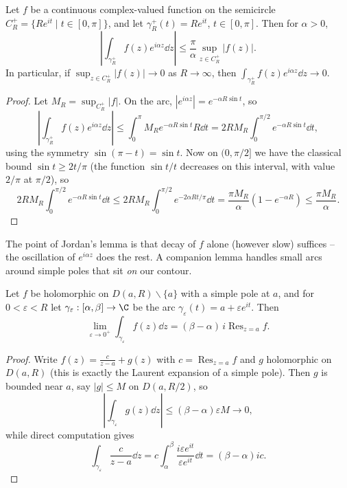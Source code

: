 \begin{lemma}
    Let $f$ be a continuous complex-valued function on the semicircle $C_R^+ = \{Re^{it} \mid t \in [0, \pi]\}$, and let $\gamma_R^+(t) = Re^{it}$, $t \in [0, \pi]$. Then for $\alpha > 0$,
    $$
    \left|\int_{\gamma_R^+} f(z)e^{i \alpha z} \dd z\right| \leq \frac{\pi}{\alpha} \sup_{z \in C_R^+} |f(z)|.
    $$
    In particular, if $\sup_{z \in C^+_R}|f(z)| \rightarrow 0$ as $R \rightarrow \infty$, then $\int_{\gamma_R^+} f(z)e^{i \alpha z} \dd z \rightarrow 0$.
\end{lemma}
\begin{proof}
    Let $M_R = \sup_{C_R^+}|f|$. On the arc, $|e^{i \alpha z}| = e^{-\alpha R \sin t}$, so
    $$
    \left|\int_{\gamma_R^+} f(z)e^{i \alpha z} \dd z\right| \leq \int_0^\pi M_R e^{-\alpha R \sin t} R \dd t = 2 R M_R \int_0^{\pi/2} e^{-\alpha R \sin t} \dd t,
    $$
    using the symmetry $\sin(\pi - t) = \sin t$. Now on $(0, \pi/2]$ we have the classical bound $\sin t \geq 2t/\pi$ (the function $\sin t / t$ decreases on this interval, with value $2/\pi$ at $\pi/2$), so
    \[
    2RM_R \int_0^{\pi/2} e^{-\alpha R \sin t} \dd t \leq 2RM_R\int_0^{\pi/2} e^{-2 \alpha R t/\pi} \dd t = \frac{\pi M_R}{\alpha}\left(1 - e^{-\alpha R}\right) \leq \frac{\pi M_R}{\alpha}.
    \]
\end{proof}

The point of Jordan's lemma is that decay of $f$ alone (however slow) suffices -- the oscillation of $e^{i \alpha z}$ does the rest. A companion lemma handles small arcs around simple poles that sit \emph{on} our contour.

\begin{lemma}
    Let $f$ be holomorphic on $D(a, R) \backslash \{a\}$ with a simple pole at $a$, and for $0 < \varepsilon < R$ let $\gamma_\varepsilon: [\alpha, \beta] \rightarrow \C$ be the arc $\gamma_\varepsilon(t) = a + \varepsilon e^{it}$. Then
    $$
    \lim_{\varepsilon \to 0^+} \int_{\gamma_\varepsilon} f(z) \dd z = (\beta - \alpha) \, i \operatorname{Res}_{z = a} f.
    $$
\end{lemma}
\begin{proof}
    Write $f(z) = \frac{c}{z - a} + g(z)$ with $c = \operatorname{Res}_{z = a}f$ and $g$ holomorphic on $D(a, R)$ (this is exactly the Laurent expansion of a simple pole). Then $g$ is bounded near $a$, say $|g| \leq M$ on $D(a, R/2)$, so
    $$
    \left|\int_{\gamma_\varepsilon} g(z) \dd z\right| \leq (\beta - \alpha)\varepsilon M \rightarrow 0,
    $$
    while direct computation gives
    \[
    \int_{\gamma_\varepsilon} \frac{c}{z - a} \dd z = c\int_\alpha^\beta \frac{i \varepsilon e^{it}}{\varepsilon e^{it}} \dd t = (\beta - \alpha) i c.
    \]
\end{proof}

